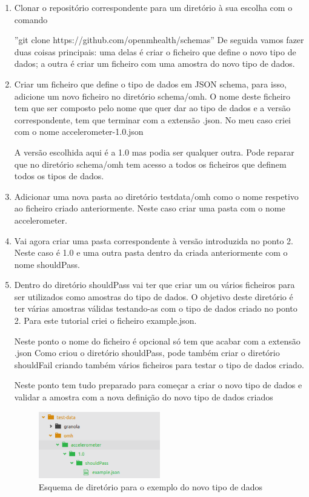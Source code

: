 \documentclass[11pt,twoside,a4paper]{report}
\begin{document}
\begin{enumerate}
  \item Clonar o repositório correspondente para um diretório à sua escolha com o comando \par
  ''git clone https://github.com/openmhealth/schemas'' 
  De seguida vamos fazer duas coisas principais: uma delas é criar o ficheiro que define o novo tipo de dados; a outra é criar um ficheiro com uma amostra do novo tipo de dados.
  \item Criar um ficheiro que define o tipo de dados em \gls{JSON} schema, para isso, adicione um novo ficheiro no diretório schema/omh. O nome deste ficheiro tem que ser composto pelo nome que quer dar ao tipo de dados e a versão correspondente, tem que terminar com a extensão .json. No meu caso criei com o nome accelerometer-1.0.json  \par A versão escolhida aqui é a 1.0 mas podia ser qualquer outra. Pode reparar que no diretório schema/omh tem acesso a todos os ficheiros que definem todos os tipos de dados.
  \item Adicionar uma nova pasta ao diretório testdata/omh como o nome respetivo ao ficheiro criado anteriormente. Neste caso criar uma pasta com o nome accelerometer.
  \item Vai agora criar uma pasta correspondente à versão introduzida no ponto 2. Neste caso é 1.0 e uma outra pasta dentro da criada anteriormente com o nome shouldPass.
  \item Dentro do diretório shouldPass vai ter que criar um ou vários ficheiros para ser utilizados como amostras do tipo de dados. O objetivo deste diretório é ter várias amostras válidas testando-as com o tipo de dados criado no ponto 2. Para este tutorial criei o ficheiro example.json. \par Neste ponto o nome do ficheiro é opcional só tem que acabar com a extensão .json
  Como criou o diretório shouldPass, pode também criar o diretório shouldFail criando também vários ficheiros para testar o tipo de dados criado. \par 
  Neste ponto tem tudo preparado para começar a criar o novo tipo de dados e validar a amostra com a nova definição do novo tipo de dados criados
  
  \begin{figure}[!ht]
  \centering
  \includegraphics[width=0.5\textwidth]{imgs/newsampledata.png}
  \caption[Esquema de diretório para o novo sample]{Esquema de diretório para o exemplo do novo tipo de dados}
  

\end{figure}
\end{enumerate}
\end{document}
